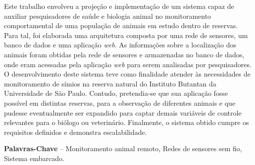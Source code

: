 \begin{resumo}

Este trabalho envolveu a projeção e implementação de um sistema capaz de auxiliar pesquisadores de saúde e biologia animal no monitoramento comportamental de uma população de animais em estudo dentro de reservas. Para tal, foi elaborada uma arquitetura composta por uma rede de sensores, um banco de dados e uma aplicação \emph{web}. As informações sobre a localização dos animais foram obtidas pela rede de sensores e armazenadas no banco de dados, onde eram acessadas pela aplicação \emph{web} para serem analisadas por pesquisadores. O desenvolvimento deste sistema teve como finalidade atender às necessidades de monitoramento de símios na reserva natural do Instituto Butantan da Universidade de São Paulo. Contudo, pretendia-se que sua aplicação fosse possível em distintas reservas, para a observação de diferentes animais e que pudesse eventualmente ser expandido para captar demais variáveis de controle relevantes para o biólogo ou veterinário. Finalmente, o sistema obtido cumpre os requisitos definidos e demonstra escalabilidade.

\textbf{Palavras-Chave} -- Monitoramento animal remoto, Redes de sensores sem fio, Sistema embarcado.
\end{resumo}
